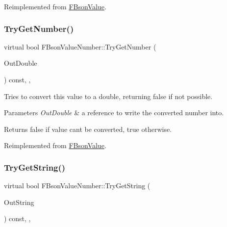 Reimplemented from \mbox{\hyperlink{class_f_bson_value_a1c7d6b561d3cc8a7db99b850740c642e}{F\+Bson\+Value}}.

\mbox{\label{class_f_bson_value_number_a6e5788ee9637c76e073c6336f1b3d263}} 
\subsubsection{\texorpdfstring{Try\+Get\+Number()}{TryGetNumber()}}
{\footnotesize\ttfamily virtual bool F\+Bson\+Value\+Number\+::\+Try\+Get\+Number (\begin{DoxyParamCaption}\item[{double \&}]{Out\+Double }\end{DoxyParamCaption}) const\hspace{0.3cm}{\ttfamily [inline]}, {\ttfamily [override]}, {\ttfamily [virtual]}}

Tries to convert this value to a double, returning false if not possible.


\begin{DoxyParams}{Parameters}
{\em Out\+Double} & a reference to write the converted number into. \\
\hline
\end{DoxyParams}
\begin{DoxyReturn}{Returns}
false if value can\textquotesingle{}t be converted, true otherwise. 
\end{DoxyReturn}


Reimplemented from \mbox{\hyperlink{class_f_bson_value_a519904f85122172ad9ca2f6b0b144f26}{F\+Bson\+Value}}.

\mbox{\label{class_f_bson_value_number_a7a8298e9a37d8d93f5b37319665e6735}} 
\subsubsection{\texorpdfstring{Try\+Get\+String()}{TryGetString()}}
{\footnotesize\ttfamily virtual bool F\+Bson\+Value\+Number\+::\+Try\+Get\+String (\begin{DoxyParamCaption}\item[{F\+String \&}]{Out\+String }\end{DoxyParamCaption}) const\hspace{0.3cm}{\ttfamily [inline]}, {\ttfamily [override]}, {\ttfamily [virtual]}}

